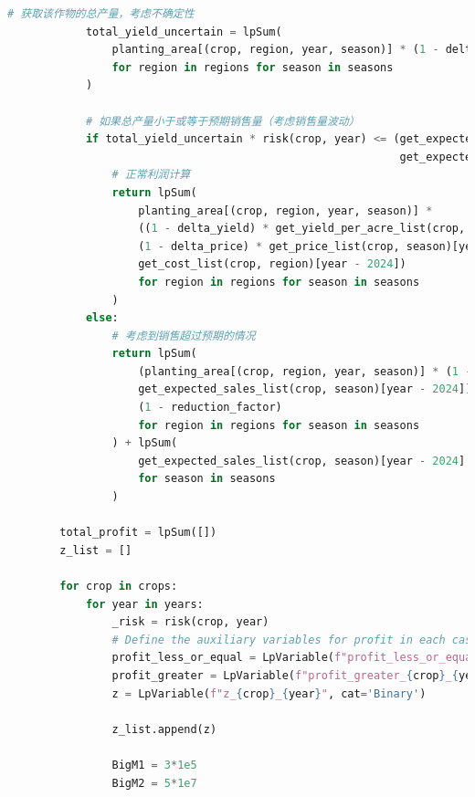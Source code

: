 \documentclass[withoutpreface]{cumcmthesis}
\begin{document}
\begin{appendices}
\begin{lstlisting}[language=python]
            # 获取该作物的总产量，考虑不确定性
            total_yield_uncertain = lpSum(
                planting_area[(crop, region, year, season)] * (1 - delta_yield) * get_yield_per_acre_list(crop, region)[year - 2024]
                for region in regions for season in seasons
            )
    
            # 如果总产量小于或等于预期销售量（考虑销售量波动）
            if total_yield_uncertain * risk(crop, year) <= (get_expected_sales_list(crop, '第一季')[year - 2024] * (1 - delta_sales) +
                                                            get_expected_sales_list(crop, '第二季')[year - 2024] * (1 - delta_sales)):
                # 正常利润计算
                return lpSum(
                    planting_area[(crop, region, year, season)] *
                    ((1 - delta_yield) * get_yield_per_acre_list(crop, region)[year - 2024] * 
                    (1 - delta_price) * get_price_list(crop, season)[year - 2024] * risk(crop, year) -
                    get_cost_list(crop, region)[year - 2024])
                    for region in regions for season in seasons
                )
            else:
                # 考虑到销售超过预期的情况
                return lpSum(
                    (planting_area[(crop, region, year, season)] * (1 - delta_yield) * get_yield_per_acre_list(crop, region)[year - 2024] -
                    get_expected_sales_list(crop, season)[year - 2024]) * (1 - delta_price) * get_price_list(crop, season)[year - 2024] *
                    (1 - reduction_factor)
                    for region in regions for season in seasons
                ) + lpSum(
                    get_expected_sales_list(crop, season)[year - 2024] * (1 - delta_price) * get_price_list(crop, season)[year - 2024]
                    for season in seasons
                )
    
        total_profit = lpSum([])
        z_list = []
    
        for crop in crops:
            for year in years:
                _risk = risk(crop, year)
                # Define the auxiliary variables for profit in each case
                profit_less_or_equal = LpVariable(f"profit_less_or_equal_{crop}_{year}", lowBound=0)
                profit_greater = LpVariable(f"profit_greater_{crop}_{year}", lowBound=0)
                z = LpVariable(f"z_{crop}_{year}", cat='Binary')
    
                z_list.append(z)
    
                BigM1 = 3*1e5
                BigM2 = 5*1e7
    

\end{lstlisting}
\end{appendices}
\end{document}
